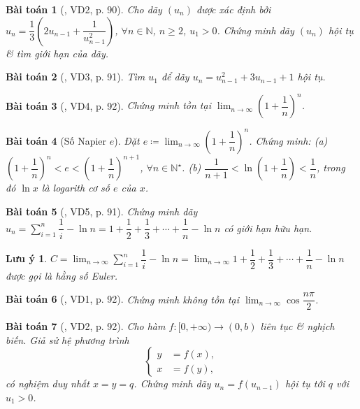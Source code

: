 \documentclass{article}
\newtheorem{baitoan}{Bài toán}
\newtheorem{luuy}{Lưu ý}
\begin{document}
\begin{baitoan}[\cite{Hung_nang_cao_phat_trien_Toan_11_tap_1}, VD2, p. 90]
	Cho dãy $(u_n)$ được xác định bởi $u_n = \dfrac{1}{3}\left(2u_{n-1} + \dfrac{1}{u_{n-1}^2}\right)$, $\forall n\in\mathbb{N}$, $n\ge2$, $u_1 > 0$. Chứng minh dãy $(u_n)$ hội tụ \& tìm giới hạn của dãy.
\end{baitoan}

\begin{baitoan}[\cite{Hung_nang_cao_phat_trien_Toan_11_tap_1}, VD3, p. 91]
	Tìm $u_1$ để dãy $u_n = u_{n-1}^2 + 3u_{n-1} + 1$ hội tụ.
\end{baitoan}

\begin{baitoan}[\cite{Hung_nang_cao_phat_trien_Toan_11_tap_1}, VD4, p. 92]
	Chứng minh tồn tại $\lim_{n\to\infty} \left(1 + \dfrac{1}{n}\right)^n$.
\end{baitoan}

\begin{baitoan}[Số Napier $e$]
	Đặt $e\coloneqq\lim_{n\to\infty} \left(1 + \dfrac{1}{n}\right)^n$. Chứng minh: (a) $ \left(1 + \dfrac{1}{n}\right)^n < e < \left(1 + \dfrac{1}{n}\right)^{n+1}$, $\forall n\in\mathbb{N}^\star$. (b) $\dfrac{1}{n + 1} < \ln\left(1 + \dfrac{1}{n}\right) < \dfrac{1}{n}$, trong đó $\ln x$ là logarith cơ số $e$ của $x$.
\end{baitoan}

\begin{baitoan}[\cite{Hung_nang_cao_phat_trien_Toan_11_tap_1}, VD5, p. 91]
	Chứng minh dãy $u_n = \sum_{i=1}^n \dfrac{1}{i} - \ln n = 1 + \dfrac{1}{2} + \dfrac{1}{3} + \cdots + \dfrac{1}{n} - \ln n$ có giới hạn hữu hạn.
\end{baitoan}

\begin{luuy}
	$C = \lim_{n\to\infty} \sum_{i=1}^n \dfrac{1}{i} - \ln n = \lim_{n\to\infty}  1 + \dfrac{1}{2} + \dfrac{1}{3} + \cdots + \dfrac{1}{n} - \ln n$ được gọi là {\rm hằng số Euler}.
\end{luuy}

\begin{baitoan}[\cite{Hung_nang_cao_phat_trien_Toan_11_tap_1}, VD1, p. 92]
	Chứng minh không tồn tại $\lim_{n\to\infty} \cos\dfrac{n\pi}{2}$.
\end{baitoan}

\begin{baitoan}[\cite{Hung_nang_cao_phat_trien_Toan_11_tap_1}, VD2, p. 92]
	Cho hàm $f:[0,+\infty)\to(0,b)$ liên tục \& nghịch biến. Giả sử hệ phương trình
	\begin{equation*}
		\left\{\begin{split}
			y &= f(x),\\
			x &= f(y),
		\end{split}\right.
	\end{equation*}
	có nghiệm duy nhất $x = y = q$. Chứng minh dãy $u_n = f(u_{n-1})$ hội tụ tới $q$ với $u_1 > 0$.
\end{baitoan}
\end{document}
